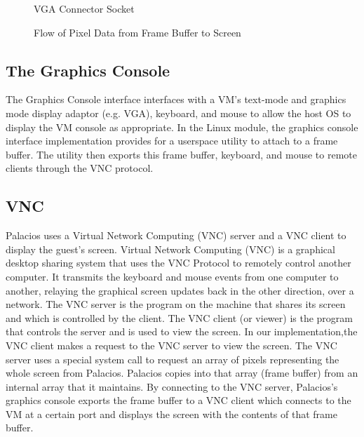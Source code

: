 \documentclass{acm_proc_article-sp}
\begin{document}
\begin{figure}                                              
\centering                                                     
{}                   
\caption{VGA Connector Socket}   
\end{figure} 

\begin{figure}                                              
\centering                                                     
{}                   
\caption{Flow of Pixel Data from Frame Buffer to Screen}   
\end{figure} 

\subsection{The Graphics Console} %
The Graphics Console interface interfaces with a VM's text\--mode and graphics
mode display adaptor (e.g. VGA), keyboard, and mouse to allow the host OS to display the VM
console as appropriate. In the Linux module, the graphics console interface implementation provides
for a userspace utility to attach to a frame buffer. The utility then exports this frame buffer, keyboard,
and mouse to remote clients through the VNC protocol. \cite{techreport}

\subsection{VNC}
Palacios uses a Virtual Network Computing (VNC) server and a VNC client to
display the guest's screen. 
Virtual Network Computing (VNC) is a graphical desktop sharing system that uses the VNC Protocol to remotely control another computer. 
It transmits the keyboard and mouse events from one computer to another, relaying the graphical screen updates back in the other direction, over a network.
The VNC server is the program on the machine that shares its screen and which is controlled by the client.
The VNC client (or viewer) is the program that controls the server and is used to view the screen.
In our implementation,the VNC client makes a request to the VNC server to view the screen. 
The VNC server uses a special system call to request an array of pixels representing the whole screen from Palacios. 
Palacios copies into that array (frame buffer) from an internal array that it
maintains. By connecting to the VNC server, Palacios's graphics console exports
the frame buffer to a VNC client which connects to the VM at a certain port and
displays the screen with the contents of that frame buffer.
\end{document}
